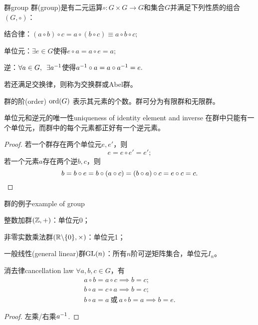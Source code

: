 \begin{definition}{群}{group}
	群(group)是有二元运算$\circ:G\times G\to G$和集合$G$并满足下列性质的组合$(G,\circ)$：
	\begin{compactitem}
		\item 结合律：$(a\circ b)\circ c=a\circ(b\circ c)\equiv a\circ b\circ c;$
		\item 单位元：$\exists e\in G$使得$e\circ a=a\circ e=a;$
		\item 逆：$\forall a\in G,\enspace\exists a^{-1}$使得$a^{-1}\circ a=a\circ a^{-1}=e.$
	\end{compactitem}
	若还满足交换律，则称为交换群或Abel群。

\end{definition}
群的阶(order) $\operatorname{ord}(G)$ 表示其元素的个数。群可分为有限群和无限群。
\begin{theorem}{单位元和逆元的唯一性}{uniqueness of identity element and inverse}
	在群中只能有一个单位元，而群中的每个元素都正好有一个逆元素。
\end{theorem}
\begin{proof}
	若一个群存在两个单位元$e,e'$，则 
	\[
		e=e\circ e'=e';
	\]
	若一个元素$a$存在两个逆$b,c$，则 
	\[
		b=b\circ e=b\circ(a\circ c)=(b\circ a)\circ c=e\circ c=c.
		\qedhere
	\]
\end{proof}
\begin{example}{群的例子}{example of group}
	\begin{compactitem}
		\item 整数加群$(\mathbb Z,+)$：单位元0；
		\item 非零实数乘法群$(\mathbb R\backslash\{0\},\times)$：单位元1；
		\item 一般线性(general linear)群$\operatorname{GL}(n)$：所有$n$阶可逆矩阵集合，单位元$I_n$。
	\end{compactitem}
\end{example}
\begin{theorem}{消去律}{cancellation law}
	$\forall a,b,c\in G$，有
	\begin{subequations}
		\begin{gather}
			a\circ b=a\circ c\implies b=c;\\
			b\circ a=c\circ a\implies b=c;\\
			b\circ a=a~\text{或}~a\circ b=a\implies b=e.
		\end{gather}
	\end{subequations}
\end{theorem}
\begin{proof}
	左乘/右乘$a^{-1}$.
\end{proof}
